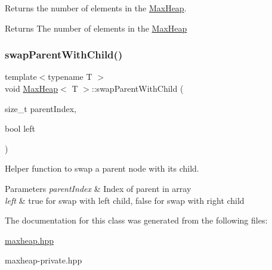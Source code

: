 Returns the number of elements in the \hyperlink{class_max_heap}{Max\+Heap}. 

\begin{DoxyReturn}{Returns}
The number of elements in the \hyperlink{class_max_heap}{Max\+Heap} 
\end{DoxyReturn}
\mbox{\label{class_max_heap_a06a4eaee6d86a0e332b38ed1f382c969}} 
\subsubsection{\texorpdfstring{swap\+Parent\+With\+Child()}{swapParentWithChild()}}
{\footnotesize\ttfamily template$<$typename T $>$ \\
void \hyperlink{class_max_heap}{Max\+Heap}$<$ T $>$\+::swap\+Parent\+With\+Child (\begin{DoxyParamCaption}\item[{size\+\_\+t}]{parent\+Index,  }\item[{bool}]{left }\end{DoxyParamCaption})\hspace{0.3cm}{\ttfamily [private]}}



Helper function to swap a parent node with its child. 


\begin{DoxyParams}{Parameters}
{\em parent\+Index} & Index of parent in array \\
\hline
{\em left} & true for swap with left child, false for swap with right child \\
\hline
\end{DoxyParams}


The documentation for this class was generated from the following files\+:\begin{DoxyCompactItemize}
\item 
\hyperlink{maxheap_8hpp}{maxheap.\+hpp}\item 
maxheap-\/private.\+hpp\end{DoxyCompactItemize}
